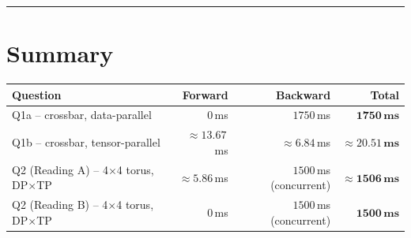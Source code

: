 \documentclass[11pt]{article}
\begin{document}
\vspace{4pt}\rule{\textwidth}{0.4pt}

\section*{Summary}

\begin{center}
\begin{tabular}{lrrr}
\toprule
\textbf{Question} & \textbf{Forward} & \textbf{Backward} & \textbf{Total} \\
\midrule
Q1a -- crossbar, data-parallel & $0$\,ms & $1750$\,ms & $\mathbf{1750\,\text{ms}}$ \\
Q1b -- crossbar, tensor-parallel & $\approx 13.67$\,ms & $\approx 6.84$\,ms & $\mathbf{\approx 20.51\,\text{ms}}$ \\
Q2 (Reading A) -- 4$\times$4 torus, DP$\times$TP & $\approx 5.86$\,ms & $1500$\,ms (concurrent) & $\mathbf{\approx 1506\,\text{ms}}$ \\
Q2 (Reading B) -- 4$\times$4 torus, DP$\times$TP & $0$\,ms & $1500$\,ms (concurrent) & $\mathbf{1500\,\text{ms}}$ \\
\bottomrule
\end{tabular}
\end{center}
\end{document}
